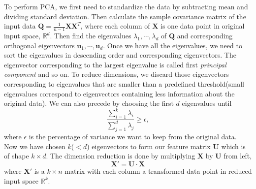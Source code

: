 \documentclass[11pt,a4paper]{article}
\theoremstyle{definition}
\numberwithin{equation}{section}
\let\vec\mathbf
\begin{document}
	To perform PCA, we first need to standardize the data by subtracting mean and dividing standard deviation. Then calculate the sample covariance matrix of the input data $\vec Q = \frac{1}{n-1}\vec X\vec X^T$, where each column of $\vec X$ is one data point in original input space, $\mathbb R^d$. Then find the eigenvalues $\lambda_1, \cdots,\lambda_d$ of $\vec Q$ and corresponding orthogonal eigenvectors $\vec u_1,\cdots,\vec u_d$. Once we have all the eigenvalues, we need to sort the eigenvalues in descending order and corresponding eigenvectors. The eigenvector corresponding to the largest eigenvalue is called first \textit{principal component} and so on. To reduce dimensions, we discard those eigenvectors corresponding to eigenvalues that are smaller than a predefined threshold(small eigenvalues correspond to eigenvectors containing less information about the original data). We can also precede by choosing the first $d$ eigenvalues until
	\begin{equation}
	\frac{\sum_{i=1}^{k}\lambda_i}{\sum_{j=1}^{d}\lambda_j}\geq \epsilon, 
	\end{equation} 
	where $\epsilon$ is the percentage of variance we want to keep from the original data. Now we have chosen $k$($<d$) eigenvectors to form our feature matrix $\vec U$ which is of shape $k\times d$. The dimension reduction is done by multiplying $\vec X$ by $\vec U$ from left,
	\begin{equation}
	\vec X' = \vec U \cdot \vec X
	\end{equation}
	where $\vec X'$ is a $k\times n$ matrix with each column a transformed data point in reduced input space $\mathbb R^k$.
	
\end{document}
